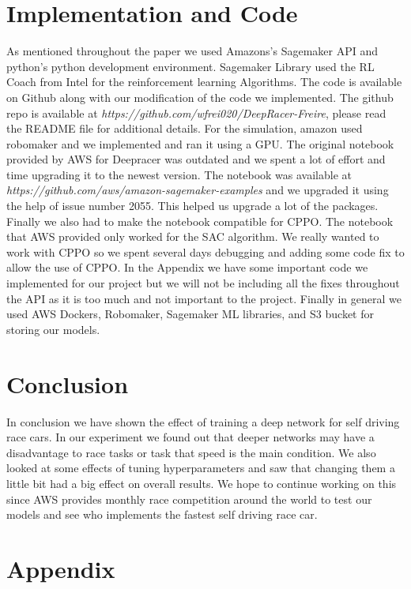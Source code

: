\documentclass[journal]{IEEEtran}
\begin{document}
\section{Implementation and Code}
As mentioned throughout the paper we used Amazons’s Sagemaker API and python’s python development environment.  Sagemaker Library used the RL Coach from Intel for the reinforcement learning Algorithms.  The code is available on Github along with our modification of the code we implemented.  The github repo is available at \emph{https://github.com/wfrei020/DeepRacer-Freire}, please read the README file for additional details.  For the simulation, amazon used robomaker and we implemented and ran it using a GPU.  The original notebook provided by AWS for Deepracer was outdated and we spent a lot of effort and time upgrading it to the newest version.  The notebook was available at \emph{https://github.com/aws/amazon-sagemaker-examples} and we upgraded it using the help of issue number 2055.  This helped us upgrade a lot of the packages.  Finally we also had to make the notebook compatible for CPPO.  The notebook that AWS provided only worked for the SAC algorithm.  We really wanted to work with CPPO so we spent several days debugging and adding some code fix to allow the use of CPPO.  In the Appendix we have some important code we implemented for our project but we will not be including all the fixes throughout the API as it is too much and not important to the project. Finally in general we used AWS Dockers, Robomaker, Sagemaker ML libraries, and S3 bucket for storing our models. 

\section{Conclusion}
In conclusion we have shown the effect of training a deep network for self driving race cars.  In our experiment we found out that deeper networks may have a disadvantage to race tasks or task that speed is the main condition.  We also looked at some effects of tuning hyperparameters and saw that changing them a little bit had a big effect on overall results.  We hope to continue working on this since AWS provides monthly race competition around the world to test our models and see who implements the fastest self driving race car.




\newpage

\section{Appendix}
\end{document}
